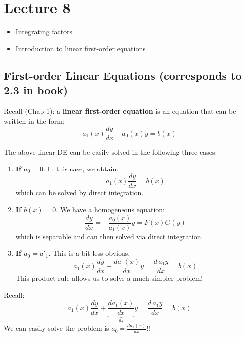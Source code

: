 
\chapter*{Lecture 8}
\begin{recall}{}{}
\begin{itemize}

\item Integrating factors
\item Introduction to linear first-order equations
\end{itemize}
\end{recall}


\section{First-order Linear Equations (corresponds to 2.3 in book)}

Recall (Chap 1): a \textbf{linear first-order equation} is an equation that can be written in the form:
\begin{equation}
a_1(x)\frac{dy}{dx}+a_0(x) y=b(x)
\label{firstorderlinear}
\end{equation}

The above linear DE can be easily solved in the following three cases:
\begin{enumerate}
\item \textbf{If $a_0=0$}. In this case, we obtain:
\begin{equation*}
a_1(x)\frac{dy}{dx} =b(x)
\end{equation*}
which can be solved by direct integration. 
\item \textbf{If $b(x)=0$}. We have a homogeneous equation:
\begin{equation*}
\frac{dy}{dx} =-\frac{a_0(x)}{a_1(x)} y= F(x)G(y)
\end{equation*}
which is separable and can then solved via direct integration.
\item \textbf{If $a_0=a'_1$}. This is a bit less obvious. 
\begin{equation*}
a_1(x)\frac{dy}{dx}+\frac{da_1(x)}{dx} y=\frac{d\,a_1 y}{dx}=b(x)
\label{ODElin}
\end{equation*}
This product rule allows us to solve a much simpler problem!
\end{enumerate}



Recall:
\begin{equation*}
a_1(x)\frac{dy}{dx}+\underbrace{\frac{da_1(x)}{dx}}_{a_0} y=\frac{d\,a_1 y}{dx}=b(x)
\end{equation*}
We can easily solve the problem is $a_0=\frac{da_1(x)}{dx} $!! \\

